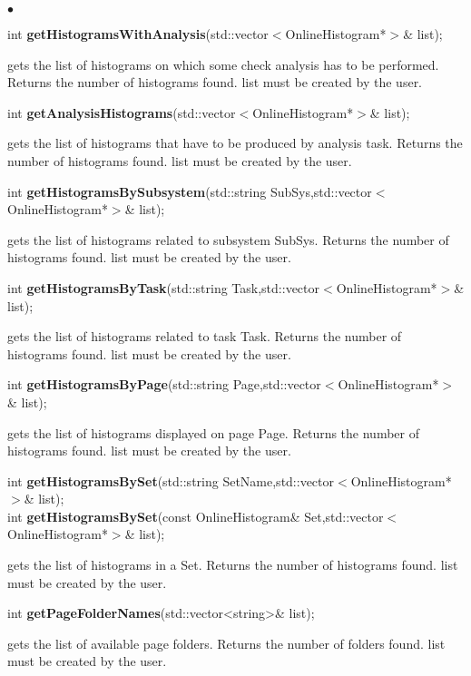 \documentclass{lhcbnote}
\begin{document}
\begin{list}{$\bullet$}{}

\item int {\bf getHistogramsWithAnalysis}(std::vector$<$OnlineHistogram*$>$\&
list);

gets the list of histograms on which some check analysis has to be
performed. Returns the number of histograms found. list must be
created by the user.

\item int {\bf getAnalysisHistograms}(std::vector$<$OnlineHistogram*$>$\& list);

gets the list of histograms that have to be produced by analysis
task. Returns the number of histograms found. list must be
created by the user.

\item int {\bf getHistogramsBySubsystem}(std::string
SubSys,std::vector$<$OnlineHistogram*$>$\& list);

gets the list of histograms related to subsystem SubSys. Returns the
number of histograms found. list must be created by the user.

\item  int {\bf getHistogramsByTask}(std::string
Task,std::vector$<$OnlineHistogram*$>$\& list);

  gets the list of histograms related to task Task. Returns the
number of histograms found. list must be created by the user.

\item  int {\bf getHistogramsByPage}(std::string Page,std::vector$<$OnlineHistogram*$>$\& list);

  gets the list of histograms displayed on page Page. Returns the
number of histograms found. list must be created by the user.

\item  int {\bf getHistogramsBySet}(std::string SetName,std::vector$<$OnlineHistogram*$>$\& list);\\
int {\bf getHistogramsBySet}(const OnlineHistogram\& Set,std::vector$<$OnlineHistogram*$>$\& list);

  gets the list of histograms in a Set. Returns the
number of histograms found. list must be created by the user.

\item   int {\bf getPageFolderNames}(std::vector<string>\& list);

 gets the list of available page folders. Returns the
number of folders found. list must be created by the user.


\end{list}
\end{document}

